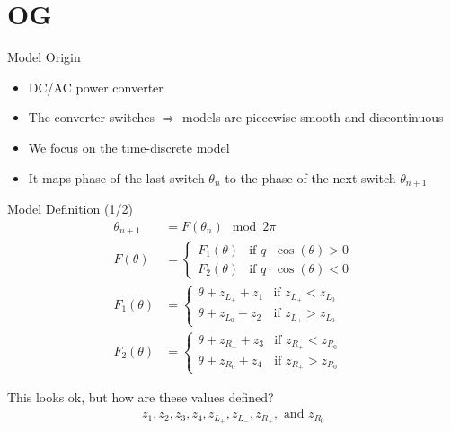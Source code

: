 \section{OG}

\begin{frame}{Model Origin}
	\begin{itemize}
		\item DC/AC power converter
		\item The converter switches $\Rightarrow$ models are piecewise-smooth and discontinuous
            \pause \vspace{1em}
		\item We focus on the time-discrete model
		\item It maps phase of the last switch $\theta_n$ to the phase of the next switch $\theta_{n+1}$
	\end{itemize}
\end{frame}

\begin{frame}{Model Definition (1/2)}
	\vspace{-2.0em}
	\begin{align}
		\theta_{n+1} & =  F(\theta_n) \mod 2 \pi
		\\
		F(\theta)    & = \begin{cases}
			                 F_1(\theta) & \text{if } q \cdot \cos(\theta) > 0 \\
			                 F_2(\theta) & \text{if } q \cdot \cos(\theta) < 0
		                 \end{cases}
		\\
		F_1(\theta)  & = \begin{cases}
			                 \theta + z_{L_+} + z_1 & \text{if } z_{L_+} < z_{L_0} \\
			                 \theta + z_{L_0} + z_2 & \text{if } z_{L_+} > z_{L_0}
		                 \end{cases}
		\\
		F_2(\theta)  & = \begin{cases}
			                 \theta + z_{R_+} + z_3 & \text{if } z_{R_+} < z_{R_0} \\
			                 \theta + z_{R_0} + z_4 & \text{if } z_{R_+} > z_{R_0}
		                 \end{cases}
	\end{align}

	\pause
	\vspace{2em}
	This looks ok, but how are these values defined?
	\begin{align*}
		z_1, z_2, z_3, z_4, z_{L_+}, z_{L_-}, z_{R_+}, \text{ and } z_{R_0}
	\end{align*}
\end{frame}

